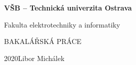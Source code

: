 \documentclass[11pt]{article}
\newcommand{\BookCover}[6]
{
	\begin{center}
		\Huge\bfseries
		#1\par\medskip
		#2\par
		\vspace{#3}
		#4\par
	\end{center}
	\vfill
	{\Huge#5\hfill#6}
	\clearpage
}
\begin{document}
\BookCover{VŠB -- Technická univerzita Ostrava}{Fakulta elektrotechniky a informatiky}{96mm}{BAKALÁŘSKÁ PRÁCE}{2020}{Libor Michálek}
\end{document}
